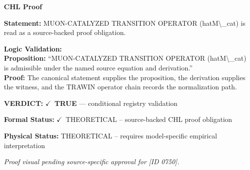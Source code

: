 \vspace{0.45em}
\noindent\textbf{CHL Proof}\par
\textbf{Statement:} MUON-CATALYZED TRANSITION OPERATOR (hatM\textbackslash{}\_cat) is read as a source-backed proof obligation.

\textbf{Logic Validation:}\\
\textbf{Proposition:} ``MUON-CATALYZED TRANSITION OPERATOR (hatM\textbackslash{}\_cat) is admissible under the named source equation and derivation.''\\
\textbf{Proof:} The canonical statement supplies the proposition, the derivation supplies the witness, and the TRAWIN operator chain records the normalization path.

\textbf{VERDICT:} \ensuremath{\checkmark}\ \textbf{TRUE} --- conditional registry validation

\textbf{Formal Status:} \ensuremath{\checkmark}\ THEORETICAL -- source-backed CHL proof obligation

\textbf{Physical Status:} THEORETICAL -- requires model-specific empirical interpretation
\par\vspace{0.45em}
\par
\vfill
\begingroup\footnotesize\itshape
Proof visual pending source-specific approval for [ID 0750].
\par\endgroup
\vfill
\endgroup
\endgroup

